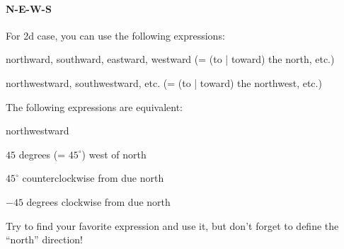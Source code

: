 \documentclass[11pt,pdfa,lastpage]{MishoNote}
\begin{document}
\paragraph{N-E-W-S}
For 2d case,  you can use the following expressions:
\begin{miniitemize}
 \item northward, southward, eastward, westward (= (to | toward) the north, etc.)
 \item northwestward, southwestward, etc. (= (to | toward) the northwest, etc.)
\end{miniitemize}
The following expressions are equivalent:
\begin{multicols}{2}\begin{miniitemize}
 \item northwestward
 \item $45$ degrees (= $45^\circ$) west of north
 \item $45^\circ$ counterclockwise from due north
 \item $-45$ degrees clockwise from due north
\end{miniitemize}\end{multicols}
\noindent
Try to find your favorite expression and use it, but don't forget to define the ``north'' direction!
\end{document}
